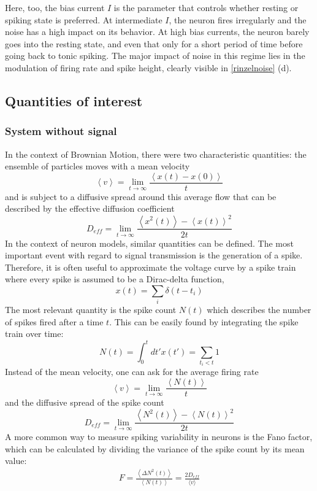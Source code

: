 \documentclass[12pt,a4paper]{article}
\begin{document}
Here, too, the bias current $I$ is the parameter that controls whether resting or spiking state is preferred. At intermediate $I$, the neuron fires irregularly and the noise has a high impact on its behavior. At high bias currents, the neuron barely goes into the resting state, and even that only for a short period of time before going back to tonic spiking. The major impact of noise in this regime lies in the modulation of firing rate and spike height, clearly visible in \ref{rinzelnoise} (d).
\subsection{Quantities of interest}
\subsubsection{System without signal}
In the context of Brownian Motion, there were two characteristic quantities: the ensemble of particles moves with a mean velocity
\begin{equation}
\left\langle v\right\rangle =\lim_{t\rightarrow\infty}\frac{\left\langle x(t)-x(0) \right\rangle}{t}
\end{equation}
and is subject to a diffusive spread around this average flow that can be described by the effective diffusion coefficient
\begin{equation}
D_{eff}=\lim_{t\rightarrow\infty}\frac{\left\langle x^2(t) \right\rangle-\left\langle x(t)\right\rangle ^2}{2t}
\end{equation}
In the context of neuron models, similar quantities can be defined. The most important event with regard to signal transmission is the generation of a spike. Therefore, it is often useful to approximate the voltage curve by a spike train where every spike is assumed to be a Dirac-delta function,
\begin{equation}
x(t)=\sum_{i}\delta(t-t_i)
\end{equation}
The most relevant quantity is the spike count $N(t)$ which describes the number of spikes fired after a time $t$. This can be easily found by integrating the spike train over time:
\begin{equation}
N(t)=\int_{0}^{t}dt'x(t')=\sum_{t_i<t} 1
\end{equation}
Instead of the mean velocity, one can ask for the average firing rate
\begin{equation}
\left\langle v\right\rangle =\lim_{t\rightarrow\infty}\frac{\left\langle N(t) \right\rangle}{t}
\end{equation} 
and the diffusive spread of the spike count
\begin{equation}
D_{eff}=\lim_{t\rightarrow\infty}\frac{\left\langle N^2(t) \right\rangle-\left\langle N(t)\right\rangle ^2}{2t}
\end{equation}
A more common way to measure spiking variability in neurons is the Fano factor, which can be calculated by dividing the variance of the spike count by its mean value:
\begin{align*}
F=\frac{\left\langle \Delta N^2(t) \right\rangle}{\left\langle N(t)\right\rangle}=\frac{2D_{eff}}{\langle v\rangle}
\end{align*}
\end{document}
